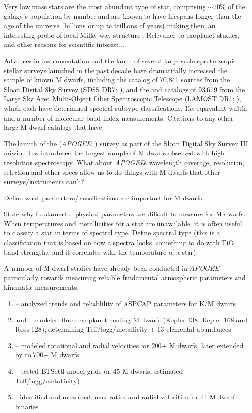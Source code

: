 \documentclass[modern]{aastex62}
\newcommand{\apogee}{\textsl{APOGEE}}
\begin{document}
Very low mass stars are the most abundant type of star, comprising $\sim 70 \%$ of the galaxy's population by number \citep{Bochanski:2010} and are known to have lifespans longer than the age of the universe (billions or up to trillions of years) \citep{Laughlin:1997} making them an interesting probe of local Milky way structure \citep{Bochanski:2007}. Relevance to exoplanet studies, and other reasons for scientific interest...

Advances in instrumentation and the lauch of several large scale spectroscopic stellar surveys launched in the past decade have dramatically increased the sample of known M dwarfs, including the \citealt{West:2011} catalog of 70,841 sources from the Sloan Digital Sky Survey (SDSS DR7; \citealt{Abazajian:2009}), and the \citealt{Yi:2014} and \citealt{Guo:2015} catalogs of 93,619 from the Large Sky Area Multi-Object Fiber Spectroscopic Telescope (LAMOST DR1; \citealt{Zhao:2012}), which each have determined spectral subtype classifications, H$\alpha$ equivalent width, and a number of molecular band index measurements. Citations to any other large M dwarf catalogs that have 

The launch of the (\apogee; \citealt{Majewski:2015}) survey as part of the Sloan Digital Sky Survey III mission \citealt{Eisenstein:2011} has introduced the largest sample of M dwarfs observed with high resolution spectroscopy. What about \apogee\'s wavelength coverage, resolution, selection and other specs allow us to do things with M dwarfs that other surveys/instruments can't?

Define what parameters/classifications are important for M dwarfs.

State why fundamental physical parameters are dificult to measure for M dwarfs. When temperatures and metallicities for a star are unavailable, it is often useful to classify a star in terms of spectral type. Define spectral type (this is a classification that is based on how a spectra looks, something to do with TiO band strengths, and it correlates with the temperature of a star).

A number of M dwarf studies have already been conducted in \apogee, particularly towards measuring reliable fundamental atmospheric parameters and kinematic measurements:
\begin{enumerate}
\item \citealt{Schmidt:2016} -- analyzed trends and reliablility of ASPCAP parameters for K/M dwarfs
\item \citealt{Souto:2017} and \citealt{Souto:2018} -- modeled three exoplanet hosting M dwarfs (Kepler-138, Kepler-168 and Ross-128), determining Teff/logg/metallicity + 13 elemental abundances
\item \citealt{Desphande:2013} -- modeled rotational and radial velocities for 200+ M dwarfs, later extended by \citealt{Gilhool:2018} to 700+ M dwarfs
\item \citealt{Rajpurohit:2018} -- tested BTSettl model grids on 45 M dwarfs, estimated Teff/logg/metallicity)
\item \citealt{Skinner:2018} - identified and measured mass ratios and radial velocities for 44 M dwarf binaries
\end{enumerate}
\end{document}
